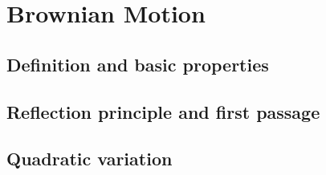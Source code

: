 
\section{Brownian Motion}

\subsection{Definition and basic properties}


\subsection{Reflection principle and first passage}


\subsection{Quadratic variation}

